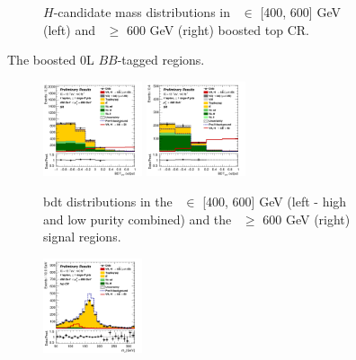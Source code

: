 \begin{figure}[h!]
\begin{subfigure}[b]{\textwidth}
        \caption{$H$-candidate mass distributions in \ptv\ $\in$ [400, 600] GeV (left) and \ptv\ $\geq$ 600 GeV (right) boosted top CR.}
        \label{fig:plots_VHbbBoost_OL_topCR}
    \end{subfigure}
    \caption{The boosted 0L $BB$-tagged regions.}
    \label{fig:plots_VHbbBoost_OL}
\end{figure} 
\vspace*{\fill}

\newpage

\vspace*{\fill}
\begin{figure}[h!]
    \centering
    \begin{subfigure}[b]{\textwidth}
        \centering
        \includegraphics[width=0.32\textwidth]{Images/VH/Own_fit/postfit_VHbb/Region_distmva_BMax600_BMin400_incFat1_Fat1_DSRnoaddbjetsr_J0_TTypebb_incJet1_T2_L1_Y6051_GlobalFit_conditionnal_mu1.png}
        \includegraphics[width=0.32\textwidth]{Images/VH/Own_fit/postfit_VHbb/Region_distmva_BMin600_incFat1_Fat1_DSRnoaddbjetsr_J0_TTypebb_incJet1_T2_L1_Y6051_GlobalFit_conditionnal_mu1.png}
        \caption{\gls{bdt} distributions in the \ptv\ $\in$ [400, 600] GeV (left - high and low purity combined) and the \ptv\ $\geq$ 600 GeV (right) signal regions.}
        \label{fig:plots_VHbbBoost_1L_SR}
    \end{subfigure}
    \begin{subfigure}[b]{\textwidth}
        \centering
        \includegraphics[width=0.32\textwidth]{Images/VH/Own_fit/postfit_VHbb/Region_distmBB_BMax600_BMin400_incFat1_Fat1_DSRtopaddbjetcr_J0_TTypebb_incJet1_T2_L1_Y6051_GlobalFit_conditionnal_mu1.png}

\end{subfigure}
\end{figure}
